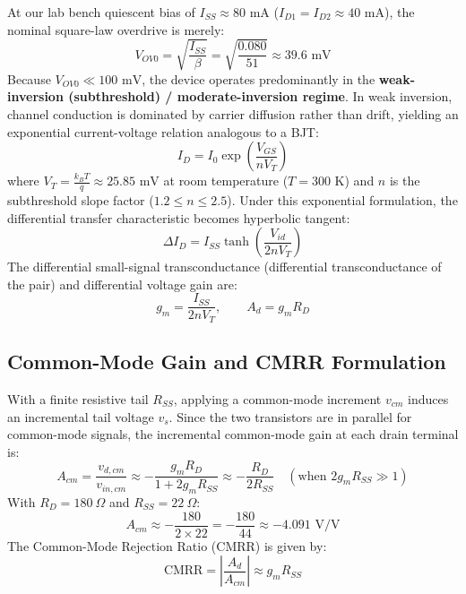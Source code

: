 \documentclass[11pt,a4paper]{article}
\begin{document}
At our lab bench quiescent bias of $I_{SS} \approx 80\text{ mA}$ ($I_{D1} = I_{D2} \approx 40\text{ mA}$), the nominal square-law overdrive is merely:
\begin{equation}
    V_{OV0} = \sqrt{\frac{I_{SS}}{\beta}} = \sqrt{\frac{0.080}{51}} \approx 39.6\text{ mV}
\end{equation}
Because $V_{OV0} \ll 100\text{ mV}$, the device operates predominantly in the \textbf{weak-inversion (subthreshold) / moderate-inversion regime}. In weak inversion, channel conduction is dominated by carrier diffusion rather than drift, yielding an exponential current-voltage relation analogous to a BJT:
\begin{equation}
    I_D = I_0 \exp\left(\frac{V_{GS}}{n V_T}\right)
\end{equation}
where $V_T = \frac{k_B T}{q} \approx 25.85\text{ mV}$ at room temperature ($T = 300\text{ K}$) and $n$ is the subthreshold slope factor ($1.2 \le n \le 2.5$). Under this exponential formulation, the differential transfer characteristic becomes hyperbolic tangent:
\begin{equation}
    \Delta I_D = I_{SS} \tanh\left(\frac{V_{id}}{2 n V_T}\right)
\end{equation}
The differential small-signal transconductance (differential transconductance of the pair) and differential voltage gain are:
\begin{equation}
    g_m = \frac{I_{SS}}{2 n V_T}, \qquad A_d = g_m R_D
\end{equation}

\subsection{Common-Mode Gain and CMRR Formulation}
With a finite resistive tail $R_{SS}$, applying a common-mode increment $v_{cm}$ induces an incremental tail voltage $v_s$. Since the two transistors are in parallel for common-mode signals, the incremental common-mode gain at each drain terminal is:
\begin{equation}
    A_{cm} = \frac{v_{d,cm}}{v_{in,cm}} \approx -\frac{g_m R_D}{1 + 2 g_m R_{SS}} \approx -\frac{R_D}{2 R_{SS}} \quad (\text{when } 2 g_m R_{SS} \gg 1)
\end{equation}
With $R_D = 180\ \Omega$ and $R_{SS} = 22\ \Omega$:
\begin{equation}
    A_{cm} \approx -\frac{180}{2 \times 22} = -\frac{180}{44} \approx -4.091\text{ V/V}
\end{equation}
The Common-Mode Rejection Ratio (CMRR) is given by:
\begin{equation}
    \text{CMRR} = \left|\frac{A_d}{A_{cm}}\right| \approx g_m R_{SS}
\end{equation}
\end{document}
